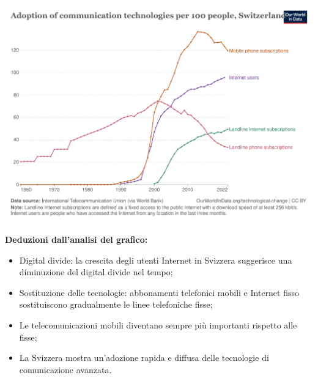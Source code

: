 \documentclass{article}
\begin{document}
\newpage
\includegraphics[width=\textwidth]{media/ict-adoption-per-100-people.pdf}

\textbf{Deduzioni dall'analisi del grafico:}
\begin{itemize}
    \item Digital divide: la crescita degli utenti Internet in Svizzera suggerisce una
        diminuzione del digital divide nel tempo;
    \item Sostituzione delle tecnologie: abbonamenti telefonici mobili e Internet fisso
        sostituiscono gradualmente le linee telefoniche fisse;
    \item Le telecomunicazioni mobili diventano sempre più importanti rispetto alle fisse;
    \item La Svizzera mostra un'adozione rapida e diffusa delle tecnologie di comunicazione
        avanzata.
\end{itemize} \phantom{}
\end{document}
